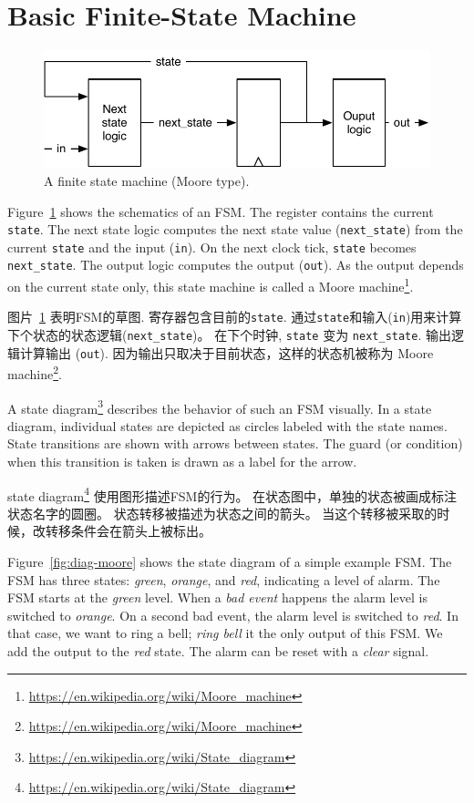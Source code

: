\documentclass[%
    10pt,
    headinclude, footexclude,
    openright, %
    notitlepage,
    cleardoubleempty,
    headsepline,
    pointlessnumbers,
    bibtotoc, idxtotoc,
    ]{scrbook}
\newcommand{\code}[1]{{\small{\texttt{#1}}}}
\newcommand{\scale}{0.7}
\newcommand{\myref}[2]{\href{#1}{#2}}
\renewcommand{\myref}[2]{{#2}{\footnote{\url{#1}}}}
\begin{document}
\section{Basic Finite-State Machine}

\begin{figure}
  \centering
  \includegraphics[scale=\scale]{figures/fsm}
  \caption{A finite state machine (Moore type).}
  \label{fig:fsm}
\end{figure}

Figure~\ref{fig:fsm} shows the schematics of an FSM. The register contains the current \code{state}.
The next state logic computes the next state value (\code{next\_state})
from the current \code{state} and the input (\code{in}).
On the next clock tick, \code{state} becomes \code{next\_state}.
The output logic computes the output (\code{out}). As the output depends on the current
state only, this state machine is called a
\myref{https://en.wikipedia.org/wiki/Moore_machine}{Moore machine}.

图片~\ref{fig:fsm} 表明FSM的草图. 寄存器包含目前的\code{state}.
通过\code{state}和输入(\code{in})用来计算下个状态的状态逻辑(\code{next\_state})。
在下个时钟, \code{state} 变为 \code{next\_state}.
输出逻辑计算输出 (\code{out}). 因为输出只取决于目前状态，这样的状态机被称为
\myref{https://en.wikipedia.org/wiki/Moore_machine}{Moore machine}.

A \myref{https://en.wikipedia.org/wiki/State_diagram}{state diagram}
describes the behavior of such an FSM visually.
In a state diagram, individual states are depicted as circles labeled
with the state names.
State transitions are shown with arrows between states.
The guard (or condition) when this transition is taken is drawn as a label
for the arrow.

\myref{https://en.wikipedia.org/wiki/State_diagram}{state diagram}
使用图形描述FSM的行为。
在状态图中，单独的状态被画成标注状态名字的圆圈。
状态转移被描述为状态之间的箭头。
当这个转移被采取的时候，改转移条件会在箭头上被标出。

Figure~\ref{fig:diag-moore} shows the state diagram of a simple example FSM.
The FSM has three states: \emph{green}, \emph{orange}, and \emph{red},
indicating a level of alarm. The FSM starts at the \emph{green} level.
When a \emph{bad event} happens the alarm level is switched to \emph{orange}.
On a second bad event, the alarm level is switched to \emph{red}.
In that case, we want to ring a bell; \emph{ring bell} it the only output of this FSM.
We add the output to the \emph{red} state.
The alarm can be reset with a \emph{clear} signal.
\end{document}
